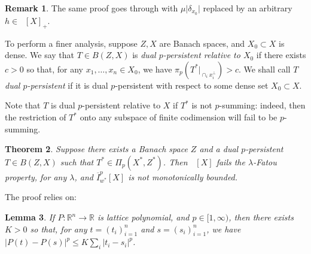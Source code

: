 \documentclass{amsart}
\theoremstyle{plain}
\newtheorem{theorem}{Theorem}[section]
\newtheorem{lemma}[theorem]{Lemma}
\theoremstyle{definition}
\newtheorem{remark}[theorem]{Remark}
\numberwithin{equation}{section}
\newcommand{\R}{\mathbb{R}}
\DeclareMathOperator{\FBLp}{FBL^{\mathit{(p)}}}
\newcommand{\Ip}{\overline{I}_{w^*}^{p}}
\begin{document}
\begin{remark}
The same proof goes through with $\mu \big| \delta_{x_0} \big|$ replaced by an arbitrary $h \in \FBLp[X]_+$.
\end{remark}


To perform a finer analysis, suppose $Z, X$ are Banach spaces, and $X_0 \subset X$ is dense. We say that $T \in B(Z,X)$ is \emph{dual $p$-persistent relative to $X_0$} if there exists $c > 0$ so that, for any $x_1, \ldots, x_n \in X_0$, we have $\pi_p(T^*|_{\cap_i x_i^\perp}) > c$.
We shall call $T$ \emph{dual $p$-persistent} if it is dual $p$-persistent with respect to some dense set $X_0 \subset X$.

Note that $T$ is dual $p$-persistent relative to $X$ if $T^*$ is not $p$-summing: indeed, then the restriction of $T^*$ onto any subspace of finite codimension will fail to be $p$-summing.

\begin{theorem}\label{failure of fatou}
Suppose there exists a Banach space $Z$ and a dual $p$-persistent $T \in B(Z,X)$ such that $T^* \in \Pi_p(X^*,Z^*)$. Then $\FBLp[X]$ fails the $\lambda$-Fatou property, for any $\lambda$, and $\Ip[X]$ is not monotonically bounded.
\end{theorem}

The proof relies on:


\begin{lemma}\label{lipschitz}
 If $P : \R^n \to \R$ is lattice polynomial, and $p \in [1,\infty)$, then there exists $K > 0$ so that, for any $t = (t_i)_{i=1}^n$ and $s = (s_i)_{i=1}^n$, we have $|P(t) - P(s)|^p \leq K \sum_i |t_i - s_i|^p$.
\end{lemma}
\end{document}
